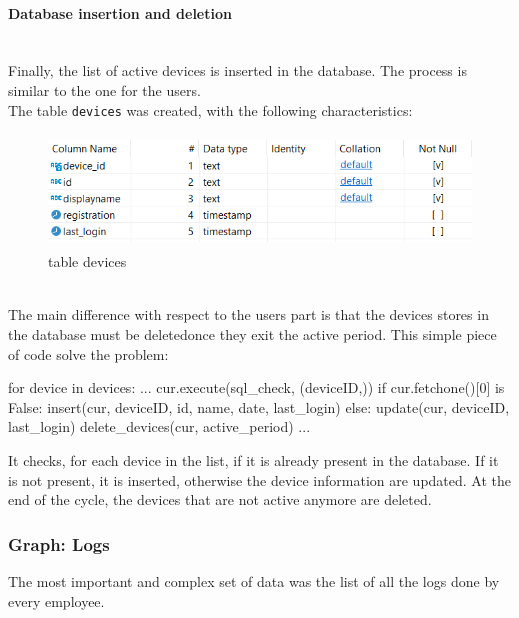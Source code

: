 \documentclass[12pt, a4paper, oneside]{article}
\begin{document}
\paragraph{Database insertion and deletion} ~\\
Finally, the list of active devices is inserted in the database. The process is similar to the one for the users.\\
The table \texttt{devices} was created, with the following characteristics:
\begin{figure}[h]
    \centering
    \includegraphics[width=12cm, height=3cm]{table-devices.png}
    \caption{table devices}
\end{figure}\\
The main difference with respect to the users part is that the devices stores in the database must be deletedonce they exit the active period.
\newline\newline
This simple piece of code solve the problem:
\begin{python}
    for device in devices:
        ...
        cur.execute(sql_check, (deviceID,))
        if cur.fetchone()[0] is False:
            insert(cur, deviceID, id, name, date, last_login)
        else:
            update(cur, deviceID, last_login)
    delete_devices(cur, active_period)
    ...
\end{python}
It checks, for each device in the list, if it is already present in the database. If it is not present, it is inserted, otherwise the device information are updated. At the end of the cycle, 
the devices that are not active anymore are deleted.

\subsubsection{Graph: Logs}
The most important and complex set of data was the list of all the logs done by every employee.
\end{document}
